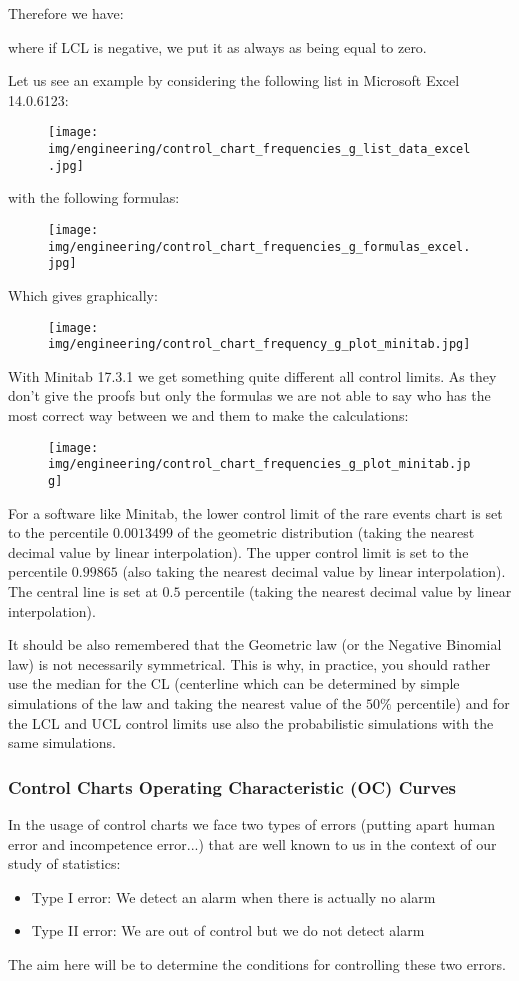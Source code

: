 	Therefore we have:
	
	where if LCL is negative, we put it as always as being equal to zero.
 
 	Let us see an example by considering the following list in Microsoft Excel 14.0.6123:
 	\begin{figure}[H]
		\centering
		\texttt{[image: img/engineering/control\_chart\_frequencies\_g\_list\_data\_excel.jpg]}
	\end{figure}
	with the following formulas:
	\begin{figure}[H]
		\centering
		\texttt{[image: img/engineering/control\_chart\_frequencies\_g\_formulas\_excel.jpg]}
	\end{figure}
	Which gives graphically:
	\begin{figure}[H]
		\centering
		\texttt{[image: img/engineering/control\_chart\_frequency\_g\_plot\_minitab.jpg]}
	\end{figure}
	With Minitab 17.3.1 we get something quite different all control limits. As they don't give the proofs but only the formulas we are not able to say who has the most correct way between we and them to make the calculations:
	\begin{figure}[H]
		\centering
		\texttt{[image: img/engineering/control\_chart\_frequencies\_g\_plot\_minitab.jpg]}
	\end{figure}
	For a software like Minitab, the lower control limit of the rare events chart is set to the percentile $0.0013499$ of the geometric distribution (taking the nearest decimal value by linear interpolation). The upper control limit is set to the percentile $0.99865$ (also taking the nearest decimal value by linear interpolation). The central line is set at $0.5$ percentile (taking the nearest decimal value by linear interpolation).
	
	It should be also remembered that the Geometric law  (or the Negative Binomial law) is not necessarily symmetrical. This is why, in practice, you should rather use the median for the CL (centerline which can be determined by simple simulations of the law and taking the nearest value of the $50\%$ percentile) and for the LCL and UCL control limits use also the probabilistic simulations with the same simulations.
	
	\pagebreak
	\subsubsection{Control Charts Operating Characteristic (OC) Curves}
	In the usage of control charts we face two types of errors (putting apart human error and incompetence error...) that are well known to us in the context of our study of statistics:
	\begin{itemize}
		\item Type I error: We detect an alarm when there is actually no alarm

		\item Type II error: We are out of control but we do not detect alarm
	\end{itemize}
	The aim here will be to determine the conditions for controlling these two errors.
	
